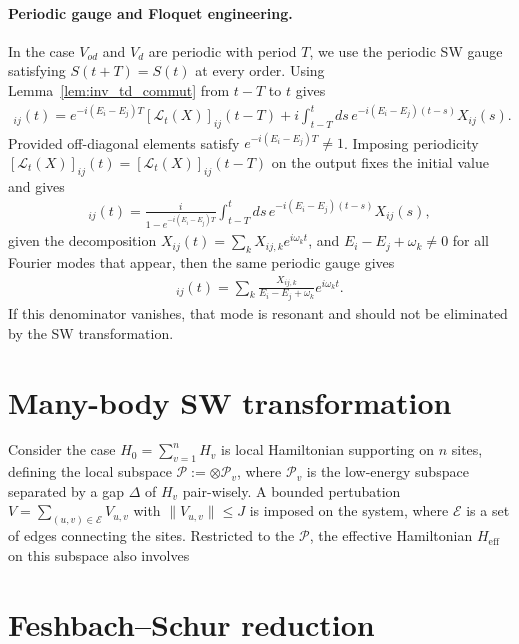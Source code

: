 \paragraph{{Periodic gauge and Floquet engineering.}}
In the case $V_{od}$ and $V_d$ are periodic with period $T$, 
we use the periodic SW gauge satisfying $S(t+T)=S(t)$ at every order.
Using Lemma~\ref{lem:inv_td_commut} from $t-T$ to $t$ gives
\begin{align}
    [\mathcal L_t(X)]_{ij}(t)
    =e^{-i(E_i-E_j)T}[\mathcal L_t(X)]_{ij}(t-T)
    +i\int_{t-T}^{t}ds\,
    e^{-i(E_i-E_j)(t-s)}X_{ij}(s).
\end{align}
Provided off-diagonal elements satisfy $e^{-i(E_i-E_j)T}\neq1$.
Imposing periodicity $[\mathcal L_t(X)]_{ij}(t) = [\mathcal L_t(X)]_{ij}(t - T)$ on the output fixes the initial value and gives
\begin{align}
    [\mathcal L_t^{\mathrm{per}}(X)]_{ij}(t)
    =\frac{i}{1-e^{-i(E_i-E_j)T}}
    \int_{t-T}^{t}ds\,
    e^{-i(E_i-E_j)(t-s)}X_{ij}(s),
\end{align}
given the decomposition $X_{ij}(t)=\sum_k X_{ij,k}e^{i\omega_k t}$,
and $E_i-E_j+\omega_k\neq0$ for all Fourier modes that appear, then the same periodic gauge gives
\begin{align}
    [\mathcal L_t^{\mathrm{per}}(X)]_{ij}(t)
    =\sum_k\frac{X_{ij,k}}{E_i-E_j+\omega_k}e^{i\omega_k t}.
\end{align}
If this denominator vanishes, that mode is resonant and should not be eliminated by the SW transformation.


\section{Many-body SW transformation}

Consider the case $H_0 = \sum_{v = 1}^n H_v$ is local Hamiltonian supporting on $n$ sites,
defining the local subspace $\mathcal{P} := \otimes \mathcal{P}_{v}$, where $\mathcal{P}_v$ is the low-energy subspace separated by a gap $\Delta$ of $H_v$ pair-wisely.
A bounded pertubation $V = \sum_{(u,v) \in \mathcal{E}} V_{u,v}$ with  $\|V_{u,v}\| \leq J$ is imposed on the system, where $\mathcal{E}$ is a set of edges connecting the sites.
Restricted to the $\mathcal{P}$, the effective Hamiltonian $H_{\mathrm{eff}}$ on this subspace also involves 



\section{Feshbach--Schur reduction}

